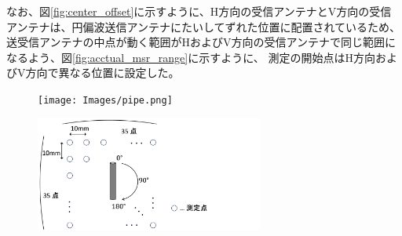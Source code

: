 \documentclass[11pt,a4paper,uplatex,draft]{ujarticle}
\begin{document}
  なお、図\ref{fig:center_offset}に示すように、H方向の受信アンテナとV方向の受信アンテナは、円偏波送信アンテナにたいしてずれた位置に配置されているため、
  送受信アンテナの中点が動く範囲がHおよびV方向の受信アンテナで同じ範囲になるよう、図\ref{fig:acctual_msr_range}に示すように、
  測定の開始点はH方向およびV方向で異なる位置に設定した。


  \begin{figure}[tbp]
    \begin{minipage}[b]{0.5\textwidth}
      \centering
      \texttt{[image: Images/pipe.png]}
      \label{fig:pipe}
    \end{minipage}
    \begin{minipage}[b]{0.5\textwidth}
      \centering
      \includegraphics[keepaspectratio, width=75mm]{Images/msr_cond.png}
      \label{fig:msr_cond}
    \end{minipage}
  \end{figure}
\end{document}
